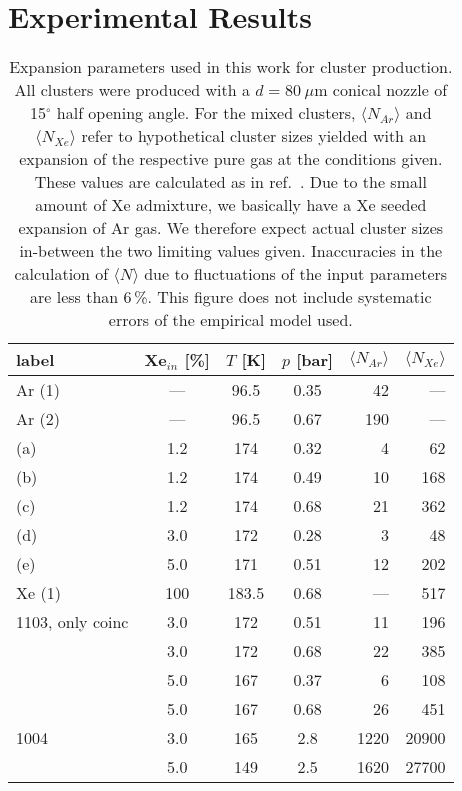 \section{Experimental Results}
\begin{table}
\caption{
Expansion parameters used in this work for cluster production. All clusters were produced with a $d = 80~\mu$m conical nozzle of 15$^\circ$ half opening angle. For the mixed clusters, $\langle N_{Ar} \rangle$ and $\langle N_{Xe} \rangle$ refer to hypothetical cluster sizes yielded with an expansion of the respective pure gas at the conditions given. These values are calculated as in ref.\ \protect{}. Due to the small amount of Xe admixture, we basically have a Xe seeded expansion of Ar gas. We therefore expect actual cluster sizes in-between the two limiting values given. Inaccuracies in the calculation of $\langle N\rangle$ due to fluctuations of the input parameters are less than 6\,\%. This figure does not include systematic errors of the empirical model used.
\label{tab:cluster} }

\begin{tabular}{l c c c r r}
%
\toprule
  label  &  Xe$_{in}$ [\%]  &  $T$ [K]  &  $p$ [bar] & $\langle N_{Ar} \rangle$ & $\langle N_{Xe} \rangle$ \\
%
\midrule
Ar (1)  & --- &  96.5  & 0.35  &  42  &  --- \\
Ar (2)  & --- &  96.5  & 0.67  & 190  &  --- \\
 (a) & 1.2 &  174   & 0.32  &   4  &   62 \\
 (b) & 1.2 &  174   & 0.49  &  10  &  168 \\
 (c) & 1.2 &  174   & 0.68  &  21  &  362 \\
 (d) & 3.0 &  172   & 0.28  &   3  &   48 \\
 (e) & 5.0 &  171   & 0.51  &  12  &  202 \\
Xe (1)  & 100 & 183.5  & 0.68  & ---  &  517 \\     
\midrule
1103, only coinc  & 3.0 &  172   & 0.51  &  11  &  196 \\
  & 3.0 &  172   & 0.68  &  22  &  385 \\
  & 5.0 &  167   & 0.37  &   6  &  108 \\
  & 5.0 &  167   & 0.68  &  26  &  451 \\
\midrule
1004  & 3.0 &  165   & 2.8   & 1220 & 20900\\
  & 5.0 &  149   & 2.5   & 1620 & 27700\\
%
\bottomrule
\end{tabular}
\end{table}


